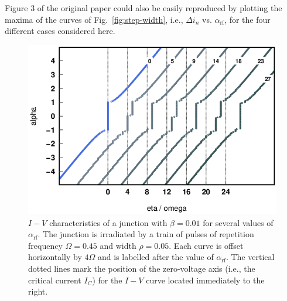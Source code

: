 Figure 3 of the original paper could also be easily reproduced by plotting the maxima of the curves of Fig.~\ref{fig:step-width}, i.e., $\Delta i_n$ vs. $\alpha_\mathrm{rf}$, for the four different cases considered here.

\begin{figure}[t]
	\centering
	\includegraphics[width = 0.7 \textwidth]{images/PULS0050-IV.png}
	\caption{$I - V$ characteristics of a junction with $\beta = 0.01$ for several values of $\alpha_\mathrm{rf}$. The junction is  irradiated by a train of pulses of repetition frequency $\Omega = 0.45$ and width $\rho = 0.05$. Each curve is offset horizontally by $4 \Omega$ and is labelled after the value of $\alpha_\mathrm{rf}$. The vertical dotted lines mark the position of the zero-voltage axis (i.e., the critical current $I_C$) for the $I - V$ curve located immediately to the right.}
	\label{fig:pulsed-ivs}
\end{figure}


